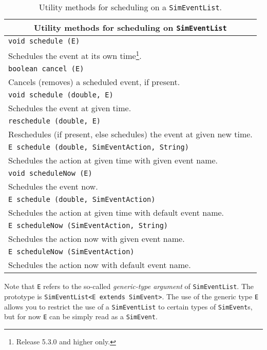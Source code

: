 \begin{table}[h]
\caption{Utility methods for scheduling on a \lstinline|SimEventList|.}
\label{SimEventList_Scheduling}
\begin{center}
\begin{tabular}{|l|}
\hline
\multicolumn{1}{|c|}{\bf Utility methods for scheduling on \lstinline|SimEventList|} \\
\hline
\lstinline[basicstyle=\footnotesize]!void schedule (E)! \\
Schedules the event at its own time\footnote{
Release 5.3.0 and higher only.}.\\
\hline
\lstinline[basicstyle=\footnotesize]!boolean cancel (E)! \\
Cancels (removes) a scheduled event, if present. \\
\hline
\lstinline[basicstyle=\footnotesize]!void schedule (double, E)! \\
Schedules the event at given time.\\
\hline
\lstinline[basicstyle=\footnotesize]!reschedule (double, E)! \\
Reschedules (if present, else schedules) the event at given new time.\\
\hline
\lstinline[basicstyle=\footnotesize]!E schedule (double, SimEventAction, String)! \\
Schedules the action at given time with given event name.\\
\hline
\lstinline[basicstyle=\footnotesize]!void scheduleNow (E)! \\
Schedules the event now.\\
\hline
\lstinline[basicstyle=\footnotesize]!E schedule (double, SimEventAction)! \\
Schedules the action at given time with default event name.\\
\hline
\lstinline[basicstyle=\footnotesize]!E scheduleNow (SimEventAction, String)! \\
Schedules the action now with given event name.\\
\hline
\lstinline[basicstyle=\footnotesize]!E scheduleNow (SimEventAction)! \\
Schedules the action now with default event name.\\
\hline
\end{tabular}
\end{center}
\end{table}

Note that \lstinline{E} refers to the so-called {\em generic-type argument\/}
  of \lstinline{SimEventList}.
The prototype is \lstinline!SimEventList<E extends SimEvent>!.
The use of the generic type \lstinline|E|
  allows you to restrict the use of a \lstinline|SimEventList|
  to certain types of \lstinline|SimEvent|s,
  but for now \lstinline!E! can be simply read as a \lstinline{SimEvent}.

